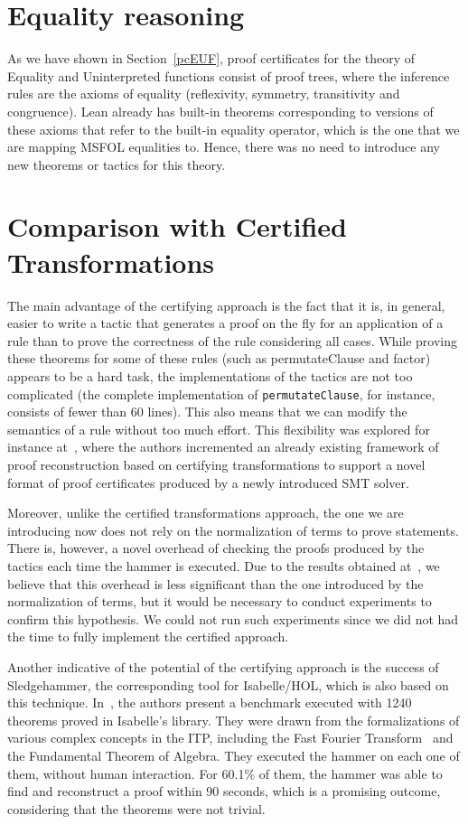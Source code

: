 \section{Equality reasoning}

As we have shown in Section~\ref{pcEUF}, proof certificates for the theory of
Equality and Uninterpreted functions consist of proof trees, where the inference
rules are the axioms of equality (reflexivity, symmetry, transitivity and congruence).
Lean already has built-in theorems corresponding to versions of these axioms that
refer to the built-in equality operator, which is the one that we are mapping MSFOL equalities to.
Hence, there was no need to introduce any new theorems or tactics for this theory.

\section{Comparison with Certified Transformations}

The main advantage of the certifying approach is the fact that it is, in general,
easier to write a tactic that generates a proof on the fly for an application
of a rule than to prove the correctness of the rule considering all cases.
%
While proving these theorems for some of these rules (such as permutateClause and
factor) appears to be a hard task, the implementations of the tactics are
not too complicated (the complete implementation of \texttt{permutateClause},
for instance, consists of fewer than 60 lines).
%
This also means that we can modify the semantics of a rule without too much effort.
%
This flexibility was explored for instance at~\cite{reliable}, where the authors
incremented an already existing framework of proof reconstruction based on certifying
transformations to support a novel format of proof certificates produced by a newly
introduced SMT solver.

Moreover, unlike the certified transformations approach, the
one we are introducing now does not rely on the normalization of terms
to prove statements. There is, however, a novel overhead of checking the proofs
produced by the tactics each time the hammer is executed.
%
Due to the results obtained at~\cite{ringLean}, we believe that
this overhead is less significant than the one introduced by the
normalization of terms, but it would be necessary to conduct
experiments to confirm this hypothesis.
We could not run such experiments since we did not had the time to
fully implement the certified approach.

Another indicative of the potential of the certifying approach is the
success of Sledgehammer, the corresponding tool for Isabelle/HOL, which is
also based on this technique.
%
In~\cite{sledgehammer}, the authors present a benchmark executed with
1240 theorems proved in Isabelle's library. They were drawn from the
formalizations of various complex concepts in the ITP, including the
Fast Fourier Transform~\cite{fft} and the Fundamental Theorem of
Algebra.
%
They executed the hammer on each one of them, without human interaction.
For 60.1\% of them, the hammer was able to find and reconstruct a proof
within 90 seconds, which is a promising outcome, considering that the
theorems were not trivial.

